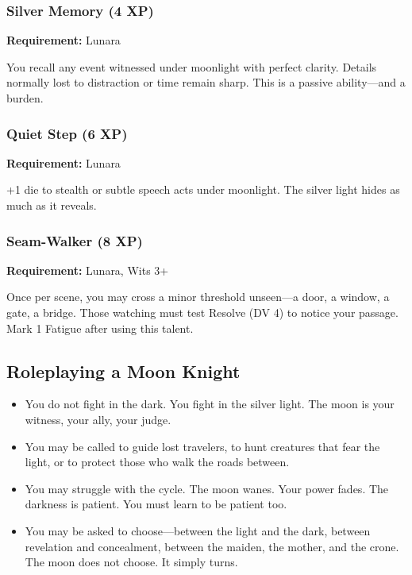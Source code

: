 \subsubsection{Silver Memory (4 XP)}

\textbf{Requirement:} Lunara

You recall any event witnessed under moonlight with perfect clarity. Details normally lost to distraction or time remain sharp. This is a passive ability—and a burden.

\subsubsection{Quiet Step (6 XP)}

\textbf{Requirement:} Lunara

+1 die to stealth or subtle speech acts under moonlight. The silver light hides as much as it reveals.

\subsubsection{Seam-Walker (8 XP)}

\textbf{Requirement:} Lunara, Wits 3+

Once per scene, you may cross a minor threshold unseen—a door, a window, a gate, a bridge. Those watching must test Resolve (DV 4) to notice your passage. Mark 1 Fatigue after using this talent.

\subsection{Roleplaying a Moon Knight}

\begin{itemize}
\item You do not fight in the dark. You fight in the silver light. The moon is your witness, your ally, your judge.
\item You may be called to guide lost travelers, to hunt creatures that fear the light, or to protect those who walk the roads between.
\item You may struggle with the cycle. The moon wanes. Your power fades. The darkness is patient. You must learn to be patient too.
\item You may be asked to choose—between the light and the dark, between revelation and concealment, between the maiden, the mother, and the crone. The moon does not choose. It simply turns.
\end{itemize}

